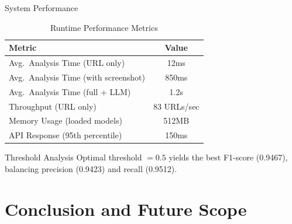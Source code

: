 \documentclass[aspectratio=169,12pt]{beamer}
\begin{document}
\begin{frame}{System Performance}
    \begin{table}
        \centering
        \begin{tabular}{lc}
            \toprule
            \textbf{Metric} & \textbf{Value} \\
            \midrule
            Avg.\ Analysis Time (URL only) & 12ms \\
            Avg.\ Analysis Time (with screenshot) & 850ms \\
            Avg.\ Analysis Time (full + LLM) & 1.2s \\
            Throughput (URL only) & 83 URLs/sec \\
            Memory Usage (loaded models) & 512MB \\
            API Response (95th percentile) & 150ms \\
            \bottomrule
        \end{tabular}
        \caption{Runtime Performance Metrics}
    \end{table}
    \vspace{0.3cm}
    \begin{block}{Threshold Analysis}
        Optimal threshold $= 0.5$ yields the best F1-score (0.9467), balancing precision (0.9423) and recall (0.9512).
    \end{block}
\end{frame}

\section{Conclusion and Future Scope}
\end{document}
